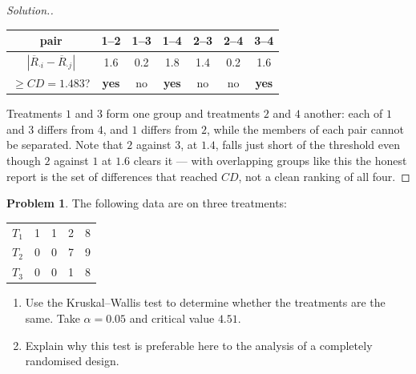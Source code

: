 \documentclass[11pt,a4paper]{article}
\theoremstyle{definition}
\newtheorem{problemx}{Problem}[section]
\newenvironment{problem}{\begin{problemx}}{\end{problemx}}
\newenvironment{solution}
  {\renewcommand{\qedsymbol}{}\begin{proof}[\textit{Solution}.]}
  {\end{proof}}
\begin{document}
\begin{solution}
\begin{table}[H]
\centering
\begin{tabular}{c|cccccc}
pair &1--2&1--3&1--4&2--3&2--4&3--4\\
\hline
$\left|\overline{R}_{\cdot i}-\overline{R}_{\cdot j}\right|$
&1.6&0.2&1.8&1.4&0.2&1.6\\
$\geq CD=1.483$? &\textbf{yes}&no&\textbf{yes}&no&no&\textbf{yes}\\
\end{tabular}
\end{table}

Treatments $1$ and $3$ form one group and treatments $2$ and $4$ another: each of
$1$ and $3$ differs from $4$, and $1$ differs from $2$, while the members of each
pair cannot be separated. Note that $2$ against $3$, at $1.4$, falls just short of
the threshold even though $2$ against $1$ at $1.6$ clears it --- with overlapping
groups like this the honest report is the set of differences that reached $CD$,
not a clean ranking of all four.
\end{solution}

\begin{problem}
The following data are on three treatments:
\begin{center}
\begin{tabular}{c|cccc}
$T_1$ & 1 & 1 & 2 & 8\\
$T_2$ & 0 & 0 & 7 & 9\\
$T_3$ & 0 & 0 & 1 & 8
\end{tabular}
\end{center}
\begin{enumerate}
\item[(a).] Use the Kruskal--Wallis test to determine whether the treatments are the
same. Take $\alpha = 0.05$ and critical value $4.51$.
\item[(b).] Explain why this test is preferable here to the analysis of a completely
randomised design.
\end{enumerate}
\end{problem}
\end{document}

